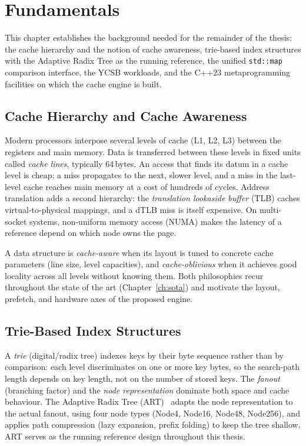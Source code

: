 \chapter{Fundamentals}\label{ch:fundamentals}

This chapter establishes the background needed for the remainder of the thesis: the
cache hierarchy and the notion of cache awareness, trie-based index structures with
the Adaptive Radix Tree as the running reference, the unified \texttt{std::map}
comparison interface, the YCSB workloads, and the C++23 metaprogramming facilities on
which the cache engine is built.

\section{Cache Hierarchy and Cache Awareness}\label{sec:cache-basics}

Modern processors interpose several levels of cache (L1, L2, L3) between the registers
and main memory. Data is transferred between these levels in fixed units called
\emph{cache lines}, typically 64\,bytes. An access that finds its datum in a cache
level is cheap; a miss propagates to the next, slower level, and a miss in the last-level
cache reaches main memory at a cost of hundreds of cycles. Address translation adds a
second hierarchy: the \emph{translation lookaside buffer} (TLB) caches virtual-to-physical
mappings, and a dTLB miss is itself expensive. On multi-socket systems, non-uniform memory
access (NUMA) makes the latency of a reference depend on which node owns the page.

A data structure is \emph{cache-aware} when its layout is tuned to concrete cache
parameters (line size, level capacities), and \emph{cache-oblivious} when it achieves good
locality across all levels without knowing them. Both philosophies recur throughout the
state of the art (Chapter~\ref{ch:sota}) and motivate the layout, prefetch, and hardware
axes of the proposed engine.

\section{Trie-Based Index Structures}\label{sec:trie-basics}

A \emph{trie} (digital/radix tree) indexes keys by their byte sequence rather than by
comparison: each level discriminates on one or more key bytes, so the search-path length
depends on key length, not on the number of stored keys. The \emph{fanout} (branching
factor) and the \emph{node representation} dominate both space and cache behaviour. The
Adaptive Radix Tree (ART)~\cite{leis2013art} adapts the node representation to the actual
fanout, using four node types (Node4, Node16, Node48, Node256), and applies path
compression (lazy expansion, prefix folding) to keep the tree shallow. ART serves as the
running reference design throughout this thesis.

